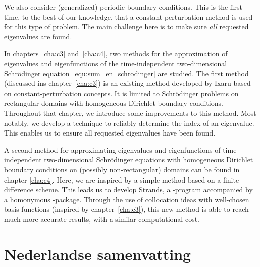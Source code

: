 We also consider (generalized) periodic boundary conditions. This is the first time, to the best of our knowledge, that a constant-perturbation method is used for this type of problem. The main challenge here is to make sure \emph{all} requested eigenvalues are found.

In chapters~\ref{cha:c3} and~\ref{cha:c4}, two methods for the approximation of eigenvalues and eigenfunctions of the time-independent two-dimensional Schrödinger equation~\eqref{equ:sum_en_schrodinger}  are studied. The first method (discussed ins chapter~\ref{cha:c3}) is an existing method developed by Ixaru based on constant-perturbation concepts. It is limited to Schrödinger problems on rectangular domains with homogeneous Dirichlet boundary conditions. Throughout that chapter, we introduce some improvements to this method. Most notably, we develop a technique to reliably determine the index of an eigenvalue. This enables us to ensure all requested eigenvalues have been found.

A second method for approximating eigenvalues and eigenfunctions of time-independent two-dimensional Schrödinger equations with homogeneous Dirichlet boundary conditions on (possibly non-rectangular) domains can be found in chapter \ref{cha:c4}. Here, we are inspired by a simple method based on a finite difference scheme. This leads us to develop Strands, a \cpp{}-program accompanied by a homonymous \lpython{}-package. Through the use of collocation ideas with well-chosen basis functions (inspired by chapter~\ref{cha:c3}), this new method is able to reach much more accurate results, with a similar computational cost.

\section*{Nederlandse samenvatting}


\stopchapter
